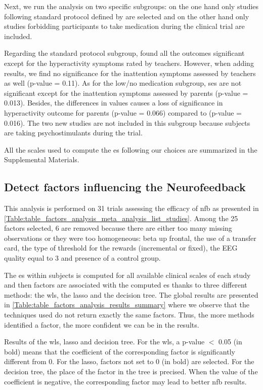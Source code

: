 Next, we run the analysis on two specific subgroups: on the one hand only studies following standard protocol defined by \citet{Arns2014}
are selected and on the other hand only studies forbidding participants to take medication during the clinical trial are included. 

Regarding the standard protocol subgroup, \citet{Cortese2016} found all the outcomes significant except for the hyperactivity symptoms 
rated by teachers. However, when adding \citep{Strehl2017} results, we find no significance for the inattention symptoms assessed by 
teachers as well (p-value = 0.11). 
As for the low/no medication subgroup, \glspl{se} are not significant except for the inattention symptoms assessed by parents (p-value = 0.013). 
Besides, the differences in \citet{Arnold2014} values causes a loss of significance in 
hyperactivity outcome for parents (p-value = 0.066) compared to \citet{Cortese2016} (p-value = 0.016). The two new studies are not 
included in this subgroup because subjects are taking psychostimulants during the trial.

All the scales used to compute the \gls{es} following our choices are summarized in the Supplemental Materials.

\subsection{Detect factors influencing the Neurofeedback}

This analysis is performed on 31 trials assessing the efficacy of \gls{nfb} as presented in \cref{Table:table_factors_analysis_meta_analysis_list_studies}. 
Among the 25 factors selected, 6 are removed because there are either too many missing observations or they were too homogeneous: beta up frontal, 
the use of a transfer card, the type of threshold for the rewards (incremental or fixed), the EEG quality equal to 3 and presence of a control group. 

The \gls{es} within subjects is computed for all available clinical scales of each study and then factors are associated with the computed \gls{es}
thanks to three different methods: the \gls{wls}, the \gls{lasso} and the decision tree. The global results are presented in \cref{Table:table_factors_analysis_results_summary}
where we observe that the techniques used do not return exactly the same factors. Thus, the more methods identified a factor, the more confident we can be in
the results.  

\begin{table}[h!]
  \centering
  \caption{Results of the \gls{wls}, \gls{lasso} and decision tree. For the \gls{wls}, a p-value $<$ 0.05 (in bold) means that the coefficient of 
	the corresponding factor is significantly different from 0. For the \gls{lasso}, factors not set to 0 (in bold) are selected. For the decision tree,
	the place of the factor in the tree is precised. When the value of the coefficient is negative, the corresponding factor may lead to better \gls{nfb} results.}
  
  \label{Table:table_factors_analysis_results_summary}
\end{table}

